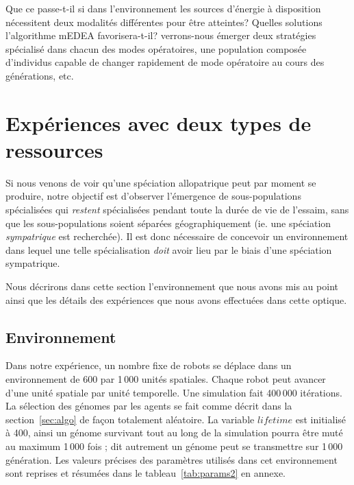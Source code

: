 \documentclass[a4paper,10pt]{report}
\begin{document}
Que ce passe-t-il si dans l'environnement les sources d'énergie à disposition nécessitent deux modalités différentes pour être atteintes? Quelles solutions l'algorithme mEDEA favorisera-t-il? verrons-nous émerger deux stratégies spécialisé dans chacun des modes opératoires, une population composée d'individus capable de changer rapidement de mode opératoire au cours des générations, etc.





\section{Expériences avec deux types de ressources}
\label{sec:expspecial}
Si nous venons de voir qu'une spéciation allopatrique peut par moment se produire, notre objectif est d'observer l'émergence de sous-populations spécialisées qui \emph{restent} spécialisées pendant toute la durée de vie de l'essaim, sans que les sous-populations soient séparées géographiquement (ie. une spéciation \emph{sympatrique} est recherchée). Il est donc nécessaire de concevoir un environnement dans lequel une telle spécialisation \emph{doit} avoir lieu par le biais d'une spéciation sympatrique. 

Nous décrirons dans cette section l'environnement que nous avons mis au point ainsi que les détails des expériences que nous avons effectuées dans cette optique.

\subsection{Environnement}

Dans notre expérience, un nombre fixe de robots se déplace dans un environnement de 600 par 1\,000 unités spatiales. Chaque robot peut avancer d'une unité spatiale par unité temporelle. Une simulation fait 400\,000 itérations. La sélection des génomes par les agents se fait comme décrit dans la section~\ref{sec:algo} de façon totalement aléatoire. La variable $lifetime$ est initialisé à 400, ainsi un génome survivant tout au long de la simulation pourra être muté au maximum 1\,000 fois ; dit autrement un génome peut se transmettre sur 1\,000 génération. Les valeurs précises des paramètres utilisés dans cet environnement sont reprises et résumées dans le tableau~\ref{tab:params2} en annexe.
\end{document}

